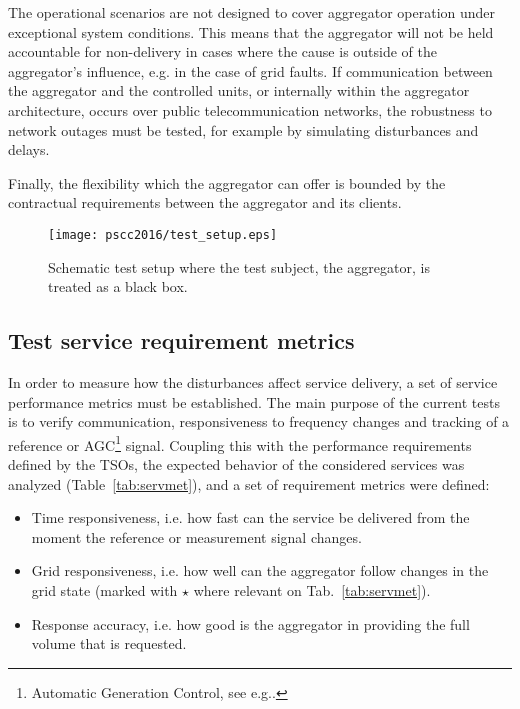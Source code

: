 The operational scenarios are not designed to cover aggregator operation under exceptional system conditions. This means that the aggregator will not be held accountable for non-delivery in cases where the cause is outside of the aggregator's influence, e.g. in the case of grid faults. If communication between the aggregator and the controlled units, or internally within the aggregator architecture, occurs over public telecommunication networks, the robustness to network outages must be tested, for example by simulating disturbances and delays.

Finally, the flexibility which the aggregator can offer is bounded by the contractual requirements between the aggregator and its clients.

\begin{figure}[!t]
\centering
\texttt{[image: pscc2016/test\_setup.eps]}
\caption{Schematic test setup where the test subject, the aggregator, is treated as a black box.}
\label{fig:test_setup}
\end{figure}

\subsection{Test service requirement metrics}\label{sec:servreqmet}

In order to measure how the disturbances affect service delivery, a set of service performance metrics must be established. The main purpose of the current tests is to verify communication, responsiveness to frequency changes and tracking of a reference or AGC\footnote{Automatic Generation Control, see e.g.\cite{entso1operational}.} signal. Coupling this with the performance requirements defined by the TSOs, the expected behavior of the considered services was analyzed (Table~\ref{tab:servmet}), and a set of requirement metrics were defined:
\begin{itemize}
\item Time responsiveness, i.e. how fast can the service be delivered from the moment the reference or measurement signal changes.
\item Grid responsiveness, i.e. how well can the aggregator follow changes in the grid state (marked with $\star$ where relevant on Tab.~\ref{tab:servmet}).
\item Response accuracy, i.e. how good is the aggregator in providing the full volume that is requested.
\end{itemize}


